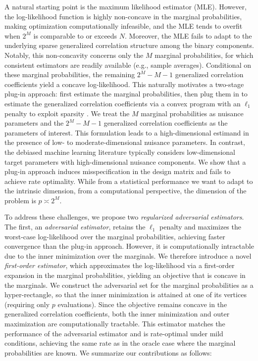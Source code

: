 \documentclass[11pt]{article}
\begin{document}
A natural starting point is the maximum likelihood estimator (MLE). However, the log-likelihood function is highly non-concave in the marginal probabilities, making optimization computationally infeasible, and the MLE tends to overfit when $2^M$ is comparable to or exceeds $N$. Moreover, the MLE fails to adapt to the underlying sparse generalized correlation structure among the binary components. Notably, this non-concavity concerns only the $M$ marginal probabilities, for which consistent estimators are readily available (e.g., sample averages). Conditional on these marginal probabilities, the remaining $2^M - M - 1$ generalized correlation coefficients yield a concave log-likelihood. This naturally motivates a two-stage plug-in approach: first estimate the marginal probabilities, then plug them in to estimate the generalized correlation coefficients via a convex program with an $\ell_1$ penalty to exploit sparsity \citep[e.g.][]{tibshirani1996regression,tibshirani1997lasso,zou2006adaptive,belloni2014high}. We treat the $M$ marginal probabilities as nuisance parameters and the $2^M - M - 1$ generalized correlation coefficients as the parameters of interest. This formulation leads to a high-dimensional estimand in the presence of low- to moderate-dimensional nuisance parameters. In contrast, the debiased machine learning literature \citep[e.g.,][]{chernozhukov2017double} typically considers low-dimensional target parameters with high-dimensional nuisance components. We show that a plug-in approach induces misspecification in the design matrix and fails to achieve rate optimality. While from a statistical performance we want to adapt to the intrinsic dimension, from a computational perspective, the dimension of the problem is $p \asymp 2^M$. 

To address these challenges, we propose two \textit{regularized adversarial estimators}. The first, an \textit{adversarial estimator}, retains the $\ell_1$ penalty and maximizes the worst-case log-likelihood over the marginal probabilities, achieving faster convergence than the plug-in approach. However, it is computationally intractable due to the inner minimization over the marginals. We therefore introduce a novel \textit{first-order estimator}, which approximates the log-likelihood via a first-order expansion in the marginal probabilities, yielding an objective that is concave in the marginals. We construct the adversarial set for the marginal probabilities as a hyper-rectangle, so that the inner minimization is attained at one of its vertices (requiring only $p$ evaluations). Since the objective remains concave in the generalized correlation coefficients, both the inner minimization and outer maximization are computationally tractable. This estimator matches the performance of the adversarial estimator and is rate-optimal under mild conditions, achieving the same rate as in the oracle case where the marginal probabilities are known. We summarize our contributions as follows: 
\end{document}
